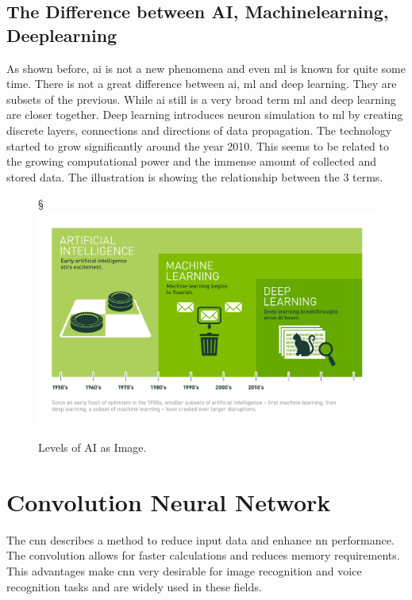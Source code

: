 \documentclass[10pt,a4paper]{article}
\begin{document}
\subsection{The Difference between AI, Machinelearning, Deeplearning}
\label{sec:AIMachinelearningDeeplearning}
As shown before, \gls{ai} is not a new phenomena and even \gls{ml} is known for quite some time. There is not a great difference between \gls{ai}, \gls{ml} and deep learning. They are subsets of the previous. While \gls{ai} still is a very broad term \gls{ml} and deep learning are closer together. Deep learning introduces neuron simulation to \gls{ml} by creating discrete layers, connections and directions of data propagation\cite{MichaelCopeland2016}. The technology started to grow significantly around the year 2010. This seems to be related to the growing computational power and the immense amount of collected and stored data\cite{MichaelCopeland2016}. The illustration is showing the relationship between the 3 terms.
\begin{figure}[H]§
	\includegraphics[width=\textwidth, height=\textheight, keepaspectratio]{Deep_Learning_Icons_R5.png}
	\caption{Levels of AI as Image\cite{MichaelCopeland2016}.}
\end{figure}

\section{Convolution Neural Network}
The \gls{cnn} describes a method to reduce input data and enhance \gls{nn} performance. The convolution allows for faster calculations and reduces memory requirements. This advantages make \gls{cnn} very desirable for image recognition and voice recognition tasks and are widely used in these fields.
\end{document}

